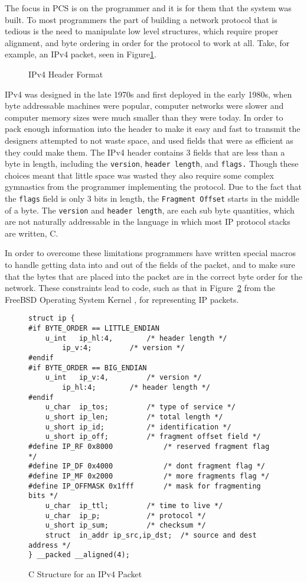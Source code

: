 \documentclass[pdftex]{article}
\begin{document}
The focus in PCS is on the programmer and it is for them that the
system was built.  To most programmers the part of building a network
protocol that is tedious is the need to manipulate low level
structures, which require proper alignment, and byte ordering in order
for the protocol to work at all.  Take, for example, an IPv4 packet,
seen in Figure\ref{fig:rfc791-ipheader}.

\begin{figure}
  \centering
\label{fig:rfc791-ipheader}
  \caption{IPv4 Header Format}
\end{figure}

IPv4 was designed in the late 1970s and first deployed in the early
1980s, when byte addressable machines were popular, computer networks
were slower and computer memory sizes were much smaller than they were
today.  In order to pack enough information into the header to make it
easy and fast to transmit the designers attempted to not waste space,
and used fields that were as efficient as they could make them.  The
IPv4 header contains 3 fields that are less than a byte in length,
including the \verb|version|, \verb|header length|, and \verb|flags.|
Though these choices meant that little space was wasted they also
require some complex gymnastics from the programmer implementing the
protocol.  Due to the fact that the \verb|flags| field is only 3 bits
in length, the \verb|Fragment Offset| starts in the middle of a
byte.  The \verb|version| and \verb|header length|, are each sub byte
quantities, which are not naturally addressable in the language in
which most IP protocol stacks are written, C.

In order to overcome these limitations programmers have written
special macros to handle getting data into and out of the fields of
the packet, and to make sure that the bytes that are placed into the
packet are in the correct byte order for the network.  These
constraints lead to code, such as that in
Figure~\ref{fig:c-structure-for-an-ipv4-packet} from the FreeBSD
Operating System Kernel \cite{mckusick:fbsd}, for representing IP
packets.

\begin{figure}
  \centering
\begin{lstlisting}
struct ip {
#if BYTE_ORDER == LITTLE_ENDIAN
	u_int	ip_hl:4,		/* header length */
		ip_v:4;			/* version */
#endif
#if BYTE_ORDER == BIG_ENDIAN
	u_int	ip_v:4,			/* version */
		ip_hl:4;		/* header length */
#endif
	u_char	ip_tos;			/* type of service */
	u_short	ip_len;			/* total length */
	u_short	ip_id;			/* identification */
	u_short	ip_off;			/* fragment offset field */
#define	IP_RF 0x8000			/* reserved fragment flag */
#define	IP_DF 0x4000			/* dont fragment flag */
#define	IP_MF 0x2000			/* more fragments flag */
#define	IP_OFFMASK 0x1fff		/* mask for fragmenting bits */
	u_char	ip_ttl;			/* time to live */
	u_char	ip_p;			/* protocol */
	u_short	ip_sum;			/* checksum */
	struct	in_addr ip_src,ip_dst;	/* source and dest address */
} __packed __aligned(4);
\end{lstlisting}
\caption{C Structure for an IPv4 Packet}
  \label{fig:c-structure-for-an-ipv4-packet}
\end{figure}
\end{document}
